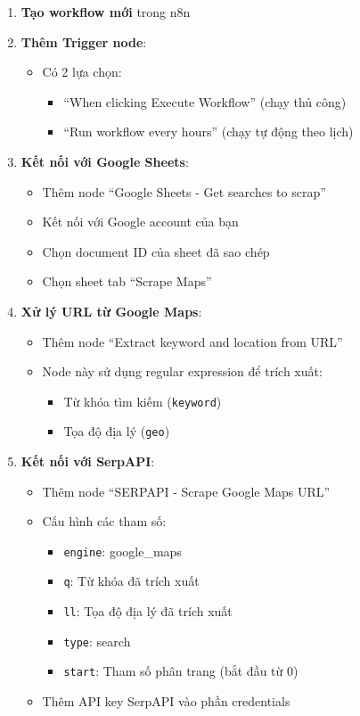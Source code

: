 \begin{enumerate}
  \item \textbf{Tạo workflow mới} trong n8n

  \item \textbf{Thêm Trigger node}:
  \begin{itemize}
    \item Có 2 lựa chọn:
    \begin{itemize}
      \item ``When clicking Execute Workflow'' (chạy thủ công)
      \item ``Run workflow every hours'' (chạy tự động theo lịch)
    \end{itemize}
  \end{itemize}

  \item \textbf{Kết nối với Google Sheets}:
  \begin{itemize}
    \item Thêm node ``Google Sheets - Get searches to scrap''
    \item Kết nối với Google account của bạn
    \item Chọn document ID của sheet đã sao chép
    \item Chọn sheet tab ``Scrape Maps''
  \end{itemize}

  \item \textbf{Xử lý URL từ Google Maps}:
  \begin{itemize}
    \item Thêm node ``Extract keyword and location from URL''
    \item Node này sử dụng regular expression để trích xuất:
    \begin{itemize}
      \item Từ khóa tìm kiếm (\texttt{keyword})
      \item Tọa độ địa lý (\texttt{geo})
    \end{itemize}
  \end{itemize}

  \item \textbf{Kết nối với SerpAPI}:
  \begin{itemize}
    \item Thêm node ``SERPAPI - Scrape Google Maps URL''
    \item Cấu hình các tham số:
    \begin{itemize}
      \item \texttt{engine}: google\_maps
      \item \texttt{q}: Từ khóa đã trích xuất
      \item \texttt{ll}: Tọa độ địa lý đã trích xuất
      \item \texttt{type}: search
      \item \texttt{start}: Tham số phân trang (bắt đầu từ 0)
    \end{itemize}
    \item Thêm API key SerpAPI vào phần credentials
  \end{itemize}


\end{enumerate}
